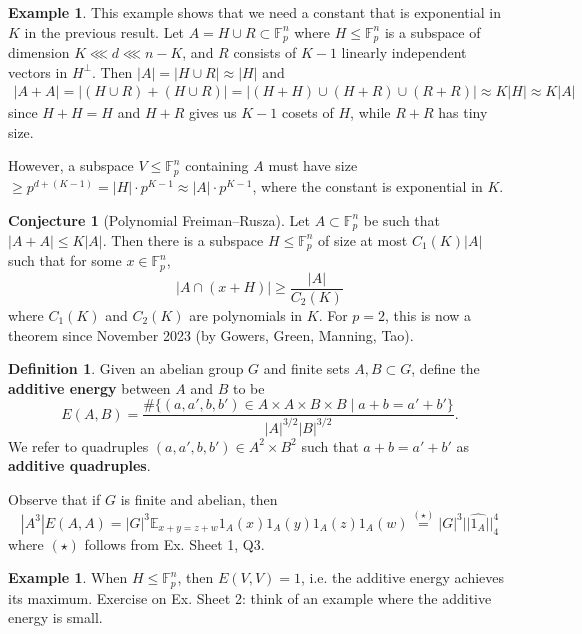 \documentclass{article}
\theoremstyle{definition}
\newtheorem{conj}[theorem]{Conjecture}
\newtheorem{example}[theorem]{Example}
\newtheorem{defn}[theorem]{Definition}
\begin{document}
\begin{example}
    This example shows that we need a constant that is exponential in $K$ in the previous result. Let $A = H \cup R \subset \mathbb{F}_p^n$ where $H \le \mathbb{F}_p^n$ is a subspace of dimension $K \lll d \lll n-K$, and $R$ consists of $K-1$ linearly independent vectors in $H^\perp$. Then $\left|A\right| = \left|H \cup R\right| \approx \left|H\right|$ and 
    \begin{align*}
        \left|A+A\right| = \left|(H\cup R)+(H\cup R)\right| = \left|(H+H)\cup(H+R)\cup(R+R)\right| \approx K\left|H\right| \approx K\left|A\right|
    \end{align*}
    since $H+H=H$ and $H+R$ gives us $K-1$ cosets of $H$, while $R+R$ has tiny size.
    \vspace{1mm}
     
    However, a subspace $V \le \mathbb{F}_p^n$ containing $A$ must have size $\ge p^{d+(K-1)} = \left|H\right|\cdot p^{K-1} \approx \left|A\right|\cdot p^{K-1}$,
    where the constant is exponential in $K$.
\end{example}
\begin{conj}[Polynomial Freiman--Rusza]
    Let $A \subset \mathbb{F}_p^n$ be such that $\left|A+A\right|\le K\left|A\right|$. Then there is a subspace $H \le \mathbb{F}_p^n$ of size at most $C_1(K)\left|A\right|$ such that for some $x \in \mathbb{F}_p^n$, $$\left|A \cap (x+H)\right| \ge \frac{\left|A\right|}{C_2(K)}$$ where $C_1(K)$ and $C_2(K)$ are polynomials in $K$. For $p=2$, this is now a theorem since November 2023 (by Gowers, Green, Manning, Tao).
\end{conj}
\begin{defn}
    Given an abelian group $G$ and finite sets $A,B \subset G$, define the \textbf{additive energy} between $A$ and $B$ to be \[
    E(A,B) = \frac{\#\{(a,a',b,b') \in A \times A \times B \times B \mid a+b=a'+b'\}}{\left|A\right|^{3/2}\left|B\right|^{3/2}}.
    \]
    We refer to quadruples $(a,a',b,b') \in A^2 \times B^2$ such that $a+b=a'+b'$ as \textbf{additive quadruples}.
\end{defn}
Observe that if $G$ is finite and abelian, then $$\left|A^3\right|E(A,A) = \left|G\right|^3 \mathbb{E}_{x+y=z+w}1_A(x)1_A(y)1_A(z)1_A(w) \stackrel{(\star)}{=} \left|G\right|^3 ||\widehat{1_A}||_4^4$$
where $(\star)$ follows from Ex. Sheet 1, Q3.
\begin{example}
    When $H \le \mathbb{F}_p^n$, then $E(V,V)=1$, i.e. the additive energy achieves its maximum. Exercise on Ex. Sheet 2: think of an example where the additive energy is small.
\end{example}
\end{document}

